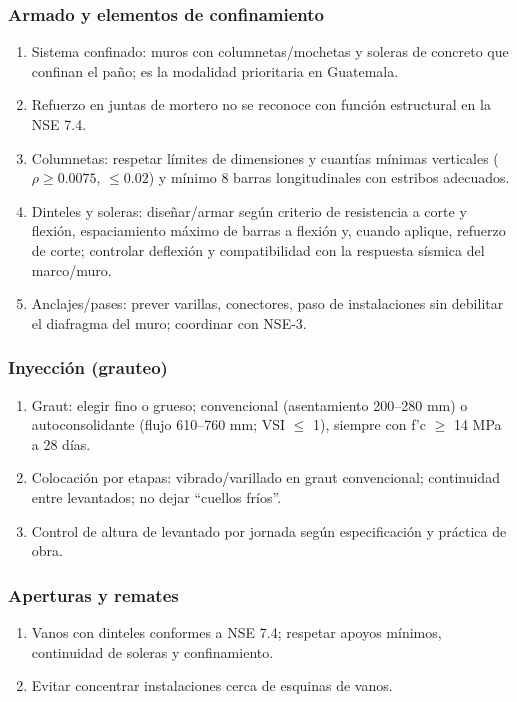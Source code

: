 \documentclass[12pt]{article}
\begin{document}
	\subsubsection{Armado y elementos de confinamiento}
	\begin{enumerate}
		\item Sistema confinado: muros con columnetas/mochetas y soleras de concreto que confinan el paño; es la modalidad prioritaria en Guatemala.
		\item Refuerzo en juntas de mortero no se reconoce con función estructural en la NSE 7.4.
		\item Columnetas: respetar límites de dimensiones y cuantías mínimas verticales ($\rho \geq 0.0075$, $\leq 0.02$) y mínimo 8 barras longitudinales con estribos adecuados.
		\item Dinteles y soleras: diseñar/armar según criterio de resistencia a corte y flexión, espaciamiento máximo de barras a flexión y, cuando aplique, refuerzo de corte; controlar deflexión y compatibilidad con la respuesta sísmica del marco/muro.
		\item Anclajes/pases: prever varillas, conectores, paso de instalaciones sin debilitar el diafragma del muro; coordinar con NSE-3.
	\end{enumerate}
	
	\subsubsection{Inyección (grauteo)}
	\begin{enumerate}
		\item Graut: elegir fino o grueso; convencional (asentamiento 200–280 mm) o autoconsolidante (flujo 610–760 mm; VSI $\leq$ 1), siempre con f’c $\geq$ 14 MPa a 28 días.
		\item Colocación por etapas: vibrado/varillado en graut convencional; continuidad entre levantados; no dejar “cuellos fríos”.
		\item Control de altura de levantado por jornada según especificación y práctica de obra.
	\end{enumerate}
	
	\subsubsection{Aperturas y remates}
	\begin{enumerate}
		\item Vanos con dinteles conformes a NSE 7.4; respetar apoyos mínimos, continuidad de soleras y confinamiento.
		\item Evitar concentrar instalaciones cerca de esquinas de vanos.
	\end{enumerate}
	
\end{document}
